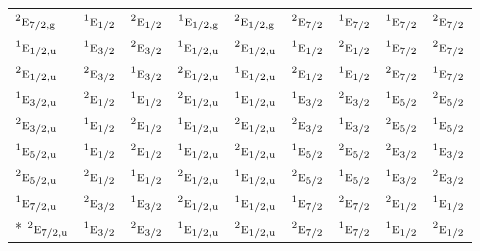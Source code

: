 \documentclass[10pt,a4paper]{article}
\numberwithin{equation}{section}
\newcommand{\irr}[1]{\text{\normalfont\scshape #1}}
\newcommand{\conjpair}[1]{{}^{#1}}
\newcommand{\ptag}[1]{\mathrm{#1}}
\begin{document}
{\begin{longtable}{@{}lcccccccc@{}}
$\conjpair{2}\irr{e}_{7/2,\ptag{g}}$ & $\conjpair{1}\irr{e}_{1/2}$ & $\conjpair{2}\irr{e}_{1/2}$ & $\conjpair{1}\irr{e}_{1/2,\ptag{g}}$ & $\conjpair{2}\irr{e}_{1/2,\ptag{g}}$ & $\conjpair{2}\irr{e}_{7/2}$ & $\conjpair{1}\irr{e}_{7/2}$ & $\conjpair{1}\irr{e}_{7/2}$ & $\conjpair{2}\irr{e}_{7/2}$\\
$\conjpair{1}\irr{e}_{1/2,\ptag{u}}$ & $\conjpair{1}\irr{e}_{3/2}$ & $\conjpair{2}\irr{e}_{3/2}$ & $\conjpair{1}\irr{e}_{1/2,\ptag{u}}$ & $\conjpair{2}\irr{e}_{1/2,\ptag{u}}$ & $\conjpair{1}\irr{e}_{1/2}$ & $\conjpair{2}\irr{e}_{1/2}$ & $\conjpair{1}\irr{e}_{7/2}$ & $\conjpair{2}\irr{e}_{7/2}$\\
$\conjpair{2}\irr{e}_{1/2,\ptag{u}}$ & $\conjpair{2}\irr{e}_{3/2}$ & $\conjpair{1}\irr{e}_{3/2}$ & $\conjpair{2}\irr{e}_{1/2,\ptag{u}}$ & $\conjpair{1}\irr{e}_{1/2,\ptag{u}}$ & $\conjpair{2}\irr{e}_{1/2}$ & $\conjpair{1}\irr{e}_{1/2}$ & $\conjpair{2}\irr{e}_{7/2}$ & $\conjpair{1}\irr{e}_{7/2}$\\
$\conjpair{1}\irr{e}_{3/2,\ptag{u}}$ & $\conjpair{2}\irr{e}_{1/2}$ & $\conjpair{1}\irr{e}_{1/2}$ & $\conjpair{2}\irr{e}_{1/2,\ptag{u}}$ & $\conjpair{1}\irr{e}_{1/2,\ptag{u}}$ & $\conjpair{1}\irr{e}_{3/2}$ & $\conjpair{2}\irr{e}_{3/2}$ & $\conjpair{1}\irr{e}_{5/2}$ & $\conjpair{2}\irr{e}_{5/2}$\\
$\conjpair{2}\irr{e}_{3/2,\ptag{u}}$ & $\conjpair{1}\irr{e}_{1/2}$ & $\conjpair{2}\irr{e}_{1/2}$ & $\conjpair{1}\irr{e}_{1/2,\ptag{u}}$ & $\conjpair{2}\irr{e}_{1/2,\ptag{u}}$ & $\conjpair{2}\irr{e}_{3/2}$ & $\conjpair{1}\irr{e}_{3/2}$ & $\conjpair{2}\irr{e}_{5/2}$ & $\conjpair{1}\irr{e}_{5/2}$\\
$\conjpair{1}\irr{e}_{5/2,\ptag{u}}$ & $\conjpair{1}\irr{e}_{1/2}$ & $\conjpair{2}\irr{e}_{1/2}$ & $\conjpair{1}\irr{e}_{1/2,\ptag{u}}$ & $\conjpair{2}\irr{e}_{1/2,\ptag{u}}$ & $\conjpair{1}\irr{e}_{5/2}$ & $\conjpair{2}\irr{e}_{5/2}$ & $\conjpair{2}\irr{e}_{3/2}$ & $\conjpair{1}\irr{e}_{3/2}$\\
$\conjpair{2}\irr{e}_{5/2,\ptag{u}}$ & $\conjpair{2}\irr{e}_{1/2}$ & $\conjpair{1}\irr{e}_{1/2}$ & $\conjpair{2}\irr{e}_{1/2,\ptag{u}}$ & $\conjpair{1}\irr{e}_{1/2,\ptag{u}}$ & $\conjpair{2}\irr{e}_{5/2}$ & $\conjpair{1}\irr{e}_{5/2}$ & $\conjpair{1}\irr{e}_{3/2}$ & $\conjpair{2}\irr{e}_{3/2}$\\
$\conjpair{1}\irr{e}_{7/2,\ptag{u}}$ & $\conjpair{2}\irr{e}_{3/2}$ & $\conjpair{1}\irr{e}_{3/2}$ & $\conjpair{2}\irr{e}_{1/2,\ptag{u}}$ & $\conjpair{1}\irr{e}_{1/2,\ptag{u}}$ & $\conjpair{1}\irr{e}_{7/2}$ & $\conjpair{2}\irr{e}_{7/2}$ & $\conjpair{2}\irr{e}_{1/2}$ & $\conjpair{1}\irr{e}_{1/2}$\\*
$\conjpair{2}\irr{e}_{7/2,\ptag{u}}$ & $\conjpair{1}\irr{e}_{3/2}$ & $\conjpair{2}\irr{e}_{3/2}$ & $\conjpair{1}\irr{e}_{1/2,\ptag{u}}$ & $\conjpair{2}\irr{e}_{1/2,\ptag{u}}$ & $\conjpair{2}\irr{e}_{7/2}$ & $\conjpair{1}\irr{e}_{7/2}$ & $\conjpair{1}\irr{e}_{1/2}$ & $\conjpair{2}\irr{e}_{1/2}$\\
\bottomrule\end{longtable}}
\end{document}
